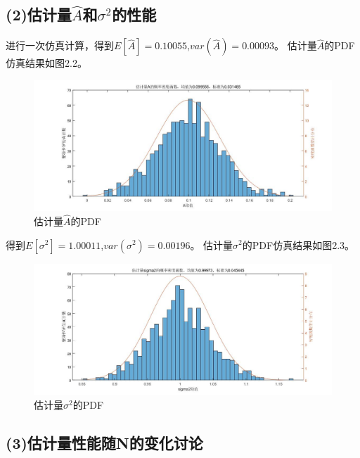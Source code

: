 \documentclass[fontset=windows]{article}
\numberwithin{figure}{section}
\begin{document}
\subsection*{(2)估计量\(\hat{A}\)和\(\sigma^2\)的性能}

进行一次仿真计算，得到\(E[\hat{A}]=0.10055\),\(var(\hat{A})=0.00093\)。
估计量\(\hat{A}\)的PDF仿真结果如图2.2。
\begin{figure}[H]
    \centering
    \includegraphics[scale=0.4]{fig2.2.jpg}
    \caption{估计量\(\hat{A}\)的PDF}
    \label{2.2}
\end{figure}

得到\(E[\sigma^2]=1.00011\),\(var(\sigma^2)=0.00196\)。
估计量\(\sigma^2\)的PDF仿真结果如图2.3。
\begin{figure}[H]
    \centering
    \includegraphics[scale=0.4]{fig2.3.jpg}
    \caption{估计量\(\sigma^2\)的PDF}
    \label{2.3}
\end{figure}

\subsection*{(3)估计量性能随N的变化讨论}
\end{document}
